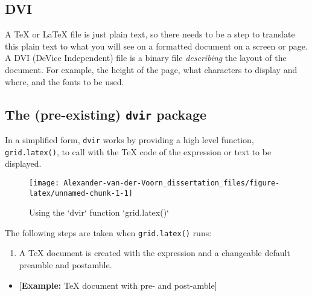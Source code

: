 \documentclass[]{article}
\newenvironment{Shaded}{\begin{snugshade}}{\end{snugshade}}
\newcommand{\KeywordTok}[1]{\textcolor[rgb]{0.13,0.29,0.53}{\textbf{#1}}}
\newcommand{\CharTok}[1]{\textcolor[rgb]{0.31,0.60,0.02}{#1}}
\newcommand{\StringTok}[1]{\textcolor[rgb]{0.31,0.60,0.02}{#1}}
\newcommand{\NormalTok}[1]{#1}
\providecommand{\tightlist}{%
  \setlength{\itemsep}{0pt}\setlength{\parskip}{0pt}}
\begin{document}
\subsection{DVI}\label{dvi}

A \TeX{} or \LaTeX{} file is just plain text, so there needs to be a
step to translate this plain text to what you will see on a formatted
document on a screen or page. A DVI (DeVice Independent) file is a
binary file \emph{describing} the layout of the document. For example,
the height of the page, what characters to display and where, and the
fonts to be used.

\subsection{\texorpdfstring{The (pre-existing) \texttt{dvir}
package}{The (pre-existing) dvir package}}\label{dvirDesc}

In a simplified form, \texttt{dvir} works by providing a high level
function, \texttt{grid.latex()}, to call with the \TeX{} code of the
expression or text to be displayed.

\begin{Shaded}
\end{Shaded}

\begin{figure}

{\centering \texttt{[image: Alexander-van-der-Voorn\_dissertation\_files/figure-latex/unnamed-chunk-1-1]} 

}

\caption{Using the `dvir` function `grid.latex()`}\label{fig:unnamed-chunk-1}
\end{figure}

The following steps are taken when \texttt{grid.latex()} runs:

\begin{enumerate}
\def\labelenumi{\arabic{enumi}.}
\tightlist
\item
  A \TeX{} document is created with the expression and a changeable
  default preamble and postamble.
\end{enumerate}

\begin{itemize}
\tightlist
\item
  {[}\textbf{Example:} TeX document with pre- and post-amble{]}
\end{itemize}
\end{document}
